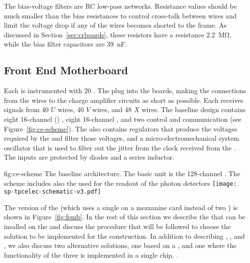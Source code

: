 The bias-voltage filters are RC low-pass networks. Resistance 
values should be much smaller than the bias resistances to control 
cross-talk between wires and limit the voltage drop if any of the 
wires becomes shorted to the  frame. As discussed
in Section~\ref{sec:crboards}, these resistors have a resistance
\SI{2.2}{\mega\ohm}, while the bias filter capacitors are \SI{39}{nF}.

\subsection{Front End Motherboard}
\label{sec:fdsp-tpcelec-design-femb}

Each  is instrumented with \num{20} .
The  plug into the   boards, 
making the connections from the wires to the charge amplifier 
circuits as short as possible. Each  receives signals 
from \num{40} $U$ wires, \num{40} $V$ wires, and \num{48} $X$ wires.
The baseline  design contains eight \num{16}-channel 
 () , eight \num{16}-channel 
 , and two  control and 
communication  (see Figure~\ref{fig:ce-scheme}).
The  also contains regulators that produce the voltages 
required by the  and filter those voltages, and 
a micro-electromechanical system oscillator that is used to
filter out the jitter from the clock received from the .
The  inputs are protected by diodes and a series inductor.

\begin{dunefigure}
{fig:ce-scheme}
{The baseline  architecture. The basic unit is the 
128-channel . The scheme includes also the 
 used for the readout of the photon detectors}
\texttt{[image: sp-tpcelec-schematic-v3.pdf]}
\end{dunefigure}

The  version of the  (which uses a single 
 on a mezzanine card instead of two  
) is shown in Figure~\ref{fig:femb}. In the rest of
this section we describe the  that can be insalled
on the  and discuss the procedure that will be 
followed to choose the  solution to be implemented
for the   construction. In addition to
describing , , and ,
we also discuss two alternative solutions, one based on a 
 , and one where the functionality of the
three  is implemented in a single chip, .

